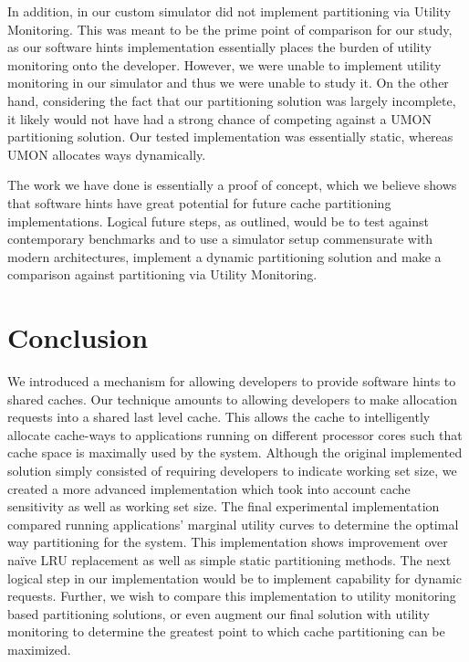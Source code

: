 \documentclass{acm_proc_article-sp}
\begin{document}
In addition, in our custom simulator did not implement partitioning via Utility Monitoring. This was meant to be the prime point of comparison for our study, as our software hints implementation essentially places the burden of utility monitoring onto the developer.  However, we were unable to implement utility monitoring in our simulator and thus we were unable to study it. On the other hand, considering the fact that our partitioning solution was largely incomplete, it likely would not have had a strong chance of competing against a UMON partitioning solution. Our tested implementation was essentially static, whereas UMON allocates ways dynamically.
 
The work we have done is essentially a proof of concept, which we believe shows that software hints have great potential for future cache partitioning implementations. Logical future steps, as outlined, would be to test against contemporary benchmarks and to use a simulator setup commensurate with modern architectures, implement a dynamic partitioning solution and make a comparison against partitioning via Utility Monitoring.

\section{Conclusion}

We introduced a mechanism for allowing developers to provide software hints to shared caches. Our technique amounts to allowing developers to make allocation requests into a shared last level cache. This allows the cache to intelligently allocate cache-ways to applications running on different processor cores such that cache space is maximally used by the system. Although the original implemented solution simply consisted of requiring developers to indicate working set size, we created a more advanced implementation which took into account cache sensitivity as well as working set size. The final experimental implementation compared running applications’ marginal utility curves to determine the optimal way partitioning for the system. This implementation shows improvement over naïve LRU replacement as well as simple static partitioning methods. The next logical step in our implementation would be to implement capability for dynamic requests. Further, we wish to compare this implementation to utility monitoring based partitioning solutions, or even augment our final solution with utility monitoring to determine the greatest point to which cache partitioning can be maximized.




\end{document}
